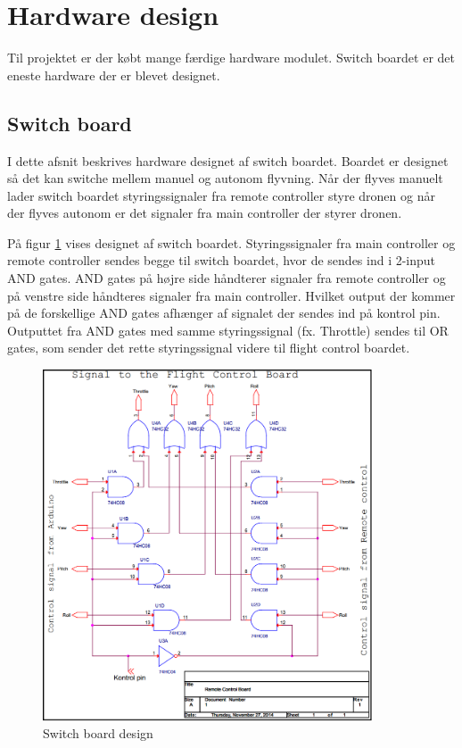 \section{Hardware design}
\vspace{-0.5cm}
Til projektet er der købt mange færdige hardware modulet. Switch boardet er det eneste hardware der er blevet designet. 

\vspace{-0.3cm}

\subsection{Switch board}
\vspace{-0.4cm}
I dette afsnit beskrives hardware designet af switch boardet. Boardet er designet så det kan switche mellem manuel og autonom flyvning. Når der flyves manuelt lader switch boardet styringssignaler fra remote controller styre dronen og når der flyves autonom er det signaler fra main controller der styrer dronen.

På figur \ref{fig:switchboard_design} vises designet af switch boardet.
Styringssignaler fra main controller og remote controller sendes begge til switch boardet, hvor de sendes ind i 2-input AND gates. AND gates på højre side håndterer signaler fra remote controller og på venstre side håndteres signaler fra main controller. Hvilket output der kommer på de forskellige AND gates afhænger af signalet der sendes ind på kontrol pin. Outputtet fra AND gates med samme styringssignal (fx. Throttle) sendes til OR gates, som sender det rette styringssignal videre til flight control boardet. 


\begin{figure}[H]
	\centering
	\includegraphics[width=0.87\textwidth]{Billeder/hardware/switch_board_diagram.png}
	\caption{Switch board design}
	\label{fig:switchboard_design}
\end{figure}
